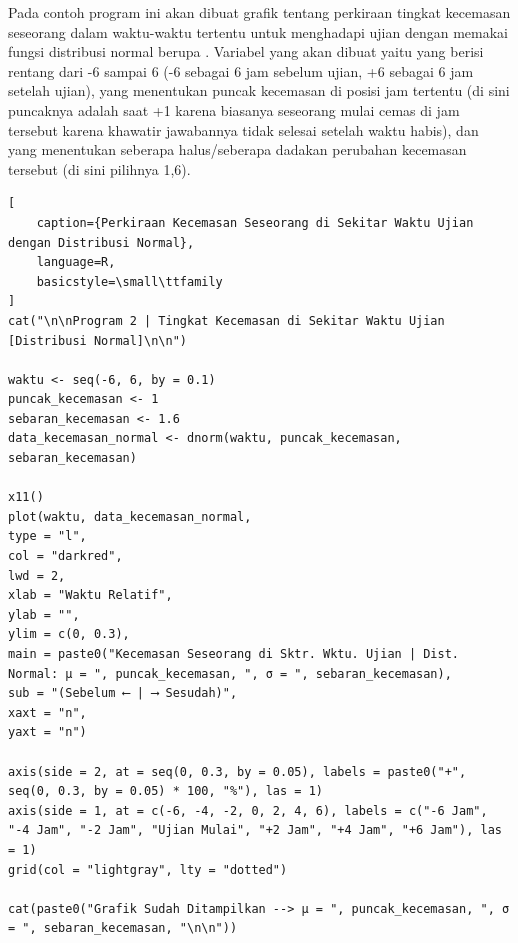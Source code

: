 Pada contoh program ini akan dibuat grafik tentang perkiraan tingkat kecemasan seseorang dalam waktu-waktu tertentu untuk menghadapi ujian dengan memakai fungsi distribusi normal berupa . Variabel yang akan dibuat yaitu  yang berisi rentang dari -6 sampai 6 (-6 sebagai 6 jam sebelum ujian, +6 sebagai 6 jam setelah ujian),  yang menentukan puncak kecemasan di posisi jam tertentu (di sini puncaknya adalah saat +1 karena biasanya seseorang mulai cemas di jam tersebut karena khawatir jawabannya tidak selesai setelah waktu habis), dan  yang menentukan seberapa halus/seberapa dadakan perubahan kecemasan tersebut (di sini pilihnya 1,6).

\begin{lstlisting}[
    caption={Perkiraan Kecemasan Seseorang di Sekitar Waktu Ujian dengan Distribusi Normal}, 
    language=R, 
    basicstyle=\small\ttfamily
]
cat("\n\nProgram 2 | Tingkat Kecemasan di Sekitar Waktu Ujian [Distribusi Normal]\n\n")

waktu <- seq(-6, 6, by = 0.1)
puncak_kecemasan <- 1
sebaran_kecemasan <- 1.6
data_kecemasan_normal <- dnorm(waktu, puncak_kecemasan, sebaran_kecemasan)

x11()
plot(waktu, data_kecemasan_normal,
type = "l",
col = "darkred",
lwd = 2,
xlab = "Waktu Relatif",
ylab = "",
ylim = c(0, 0.3),
main = paste0("Kecemasan Seseorang di Sktr. Wktu. Ujian | Dist. Normal: μ = ", puncak_kecemasan, ", σ = ", sebaran_kecemasan),
sub = "(Sebelum ⟵ | ⟶ Sesudah)",
xaxt = "n",
yaxt = "n")

axis(side = 2, at = seq(0, 0.3, by = 0.05), labels = paste0("+", seq(0, 0.3, by = 0.05) * 100, "%"), las = 1)
axis(side = 1, at = c(-6, -4, -2, 0, 2, 4, 6), labels = c("-6 Jam", "-4 Jam", "-2 Jam", "Ujian Mulai", "+2 Jam", "+4 Jam", "+6 Jam"), las = 1)
grid(col = "lightgray", lty = "dotted")

cat(paste0("Grafik Sudah Ditampilkan --> μ = ", puncak_kecemasan, ", σ = ", sebaran_kecemasan, "\n\n"))
\end{lstlisting}

